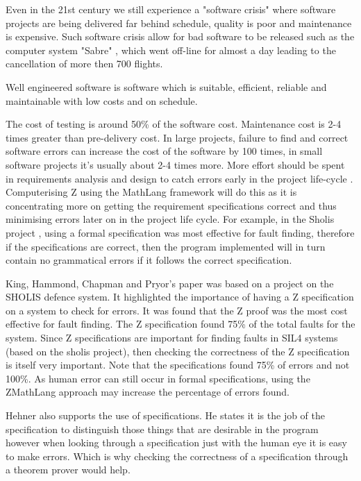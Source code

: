 Even in the 21st century we still experience a "software crisis" where software projects are being delivered far behind schedule, quality is poor and maintenance is expensive. Such software crisis allow for bad software to be released such as the computer system "Sabre" \cite{sabre}, which went off-line for almost a day leading to the cancellation of more then 700 flights.

Well engineered software is software which is suitable, efficient, reliable and maintainable with low costs and on schedule.

The cost of testing is around 50\% of the software cost. Maintenance cost is 2-4 times greater than pre-delivery cost. In large projects, failure to find and correct software errors can increase the cost of the software by 100 times, in small software projects it's usually about 2-4 times more.
More effort should be spent in requirements analysis and design to catch errors early in the project life-cycle \cite{andrewslides}. Computerising Z using the MathLang framework will do this as it is concentrating more on getting the requirement specifications correct and thus minimising errors later on in the project life cycle. For example, in the Sholis project \cite{sholis}, using a formal specification was most effective for fault finding, therefore if the specifications are correct, then the program implemented will in turn contain no grammatical errors if it follows the correct specification.

King, Hammond, Chapman and Pryor's paper \cite{sholis} was based on a project on the SHOLIS defence system. It highlighted the importance of having a Z specification on a system to check for errors. It was found that the Z proof was the most cost effective for fault finding. The Z specification found 75\% of the total faults for the system. Since Z specifications are important for finding faults in SIL4 systems (based on the sholis project), then checking the correctness of the Z specification is itself very important. Note that the specifications found 75\% of errors and not 100\%. As human error can still occur in formal specifications, using the ZMathLang approach may increase the percentage of errors found.

Hehner \cite{hehner99} also supports the use of specifications. He states it is the job of the specification to distinguish those things that are desirable in the program however when looking through a specification just with the human eye \cite{sholis} it is easy to make errors. Which is why checking the correctness of a specification through a theorem prover would help.

